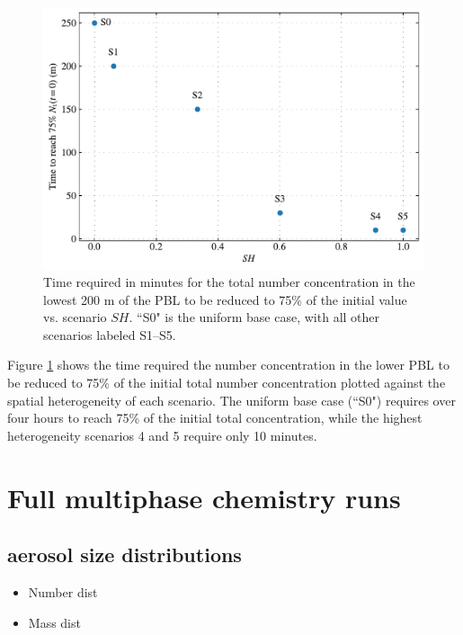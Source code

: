 \begin{figure}[t]
  \centering
    \includegraphics[width=\textwidth]{figures/chapter5/ideal-coag/TimeTo75pcnt_vs_SH.pdf}
    \caption{Time required in minutes for the total number concentration in the lowest 200 m of the PBL to be reduced to 75\% of the initial value vs. scenario $SH$. ``S0" is the uniform base case, with all other scenarios labeled S1--S5.}
    \label{fig:numconc-timescales-to-75pcent}
\end{figure}

Figure \ref{fig:numconc-timescales-to-75pcent} shows the time required the number concentration in the lower PBL to be reduced to 75\% of the initial total number concentration plotted against the spatial heterogeneity of each scenario. The uniform base case (``S0") requires over four hours to reach 75\% of the initial total concentration, while the highest heterogeneity scenarios 4 and 5 require only 10 minutes.
\section{Full multiphase chemistry runs}

\subsection{aerosol size distributions}
\begin{itemize}
\item Number dist
\item Mass dist
\end{itemize}

